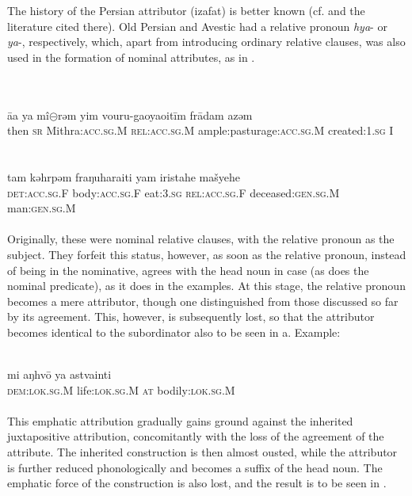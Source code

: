 The history of the Persian attributor (izafat) is better known (cf. \citealt[Ch.~\textsc{vi}.3]{Lehmann1984} and the literature cited there). Old Persian and Avestic had a relative pronoun \textit{hya}{}- or \textit{ya}{}-, respectively, which, apart from introducing ordinary relative clauses, was also used in the formation of nominal attributes, as in .

\ea\label{ex:E41}
\langinfo{\LangAvest}{}{} \\
\ea
{}\\ 
\gll \=aa  ya  mî${\circleddash}$rəm  yim  vouru-gaoyaoit\=im fr\=adam  azəm\\
then  \textsc{sr}  Mithra:\textsc{acc}.\textsc{sg}.M  \textsc{rel}:\textsc{acc}.\textsc{sg}.M  ample:pasturage:\textsc{acc}.\textsc{sg}.M created:1.\textsc{sg}  I\\
\\
\ex
{}\\
\gll  tam  kəhrpəm  fraŋuharaiti yam  iristahe  mašyehe\\
   \textsc{det}:\textsc{acc}.\textsc{sg}.F  body:\textsc{acc}.\textsc{sg}.F  eat:3.\textsc{sg}    \textsc{rel}:\textsc{acc}.\textsc{sg}.F  deceased:\textsc{gen}.\textsc{sg}.M  man:\textsc{gen}.\textsc{sg}.M\\
\\
\z
\z
\noindent Originally, these were nominal relative clauses, with the relative pronoun as the subject. They forfeit this status, however, as soon as the relative pronoun, instead of being in the nominative, agrees with the head noun in case (as does the nominal predicate), as it does in the examples. At this stage, the relative pronoun becomes a mere attributor, though one distinguished from those discussed so far by its agreement. This, however, is subsequently lost, so that the attributor becomes identical to the subordinator also to be seen in a. Example:

\ea\label{ex:E42}
\\
 \gll mi  aŋhv\=o  ya  astvainti\\
 \textsc{dem}:\textsc{lok}.\textsc{sg}.M  life:\textsc{lok}.\textsc{sg}.M  \textsc{at}  bodily:\textsc{lok}.\textsc{sg}.M\\
\\
\z
\noindent This emphatic attribution gradually gains ground against the inherited juxtapositive attribution, concomitantly with the loss of the agreement of the attribute. The inherited construction is then almost ousted, while the attributor is further reduced phonologically and becomes a suffix of the head noun. The emphatic force of the construction is also lost, and the result is to be seen in .

